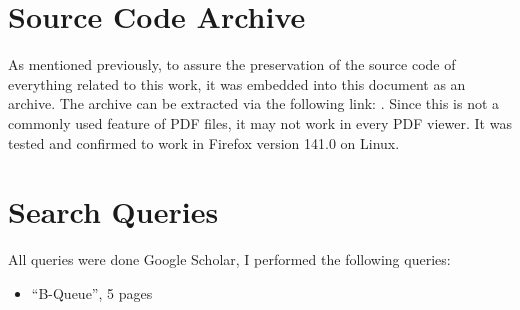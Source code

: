 \appendix

\section{Source Code Archive}
\label{app:source-code-archive}
As mentioned previously, to assure the preservation of the source code of everything related to this work, it
was embedded into this document as an archive.
The archive can be extracted via the following link: .
Since this is not a commonly used feature of PDF files, it may not work in every PDF viewer.
It was tested and confirmed to work in Firefox version 141.0 on Linux.

\section{Search Queries}
\label{app:repro-search-queries}
All queries were done Google Scholar, I performed the following queries:
\begin{itemize}
    \item ``B-Queue'', 5 pages
\end{itemize}

